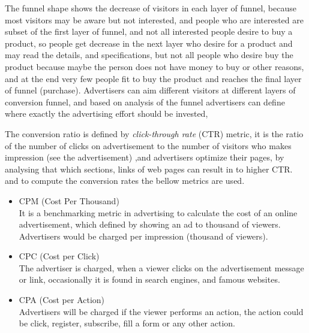 The funnel shape shows the decrease of visitors in each layer of funnel, because most visitors may be aware but not interested, and people who are interested are subset of the first layer of funnel, and not all interested people desire to buy a product, so people get decrease in the next layer who desire for a product and may read the details, and specifications, but not all people who desire buy the product because maybe the person does not have money to buy or other reasons, and at the end very few people fit to buy the product and reaches the final layer of funnel (purchase). 
Advertisers can aim different visitors at different layers of conversion funnel, and based on analysis of the funnel advertisers can define where exactly the advertising effort should be invested, \cite{ad_effor_funnel}


The conversion ratio is defined by \emph{click-through rate} (CTR) metric, it is the ratio of the number of clicks on advertisement to the number of visitors who makes impression (see the advertisement) \cite{convfunnel},and advertisers optimize their pages, by analysing that which sections, links of web pages can result in to higher CTR. and to compute the conversion rates the bellow metrics are used.


\begin{itemize}
\item CPM (Cost Per Thousand) \\
It is a benchmarking metric in advertising to calculate the cost of an online advertisement, which defined by showing an ad to thousand of viewers. Advertisers would be charged per impression (thousand of viewers). 

\item CPC (Cost per Click) \\
The advertiser is charged, when a viewer clicks on the advertisement message or link, occasionally it is found in search engines, and famous websites. 

\item CPA (Cost per Action)\\
Advertisers will be charged if the viewer performs an action, the action could be click, register, subscribe, fill a form or any other action.

\end{itemize}





